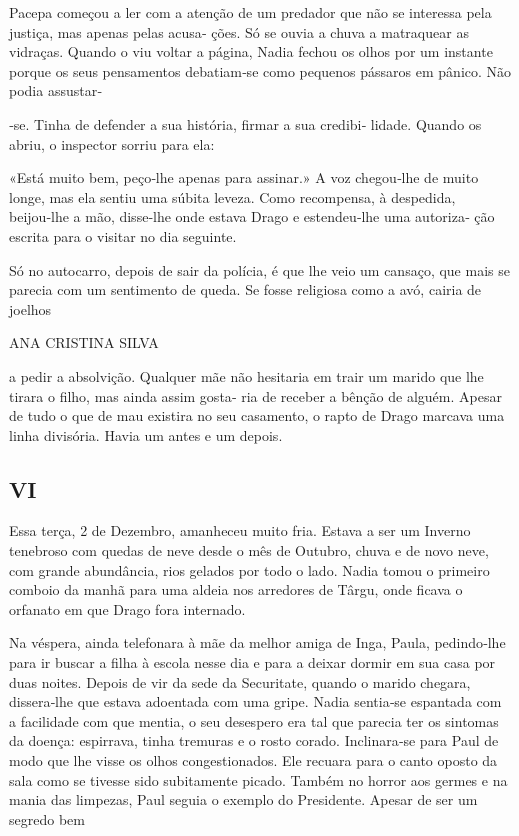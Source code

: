 Pacepa começou a ler com a atenção de um predador que não se interessa
pela justiça, mas apenas pelas acusa‑ ções. Só se ouvia a chuva a
matraquear as vidraças. Quando o viu voltar a página, Nadia fechou os
olhos por um instante porque os seus pensamentos debatiam‑se como
pequenos pássaros em pânico. Não podia assustar‑

‑se. Tinha de defender a sua história, firmar a sua credibi‑ lidade.
Quando os abriu, o inspector sorriu para ela:

«Está muito bem, peço‑lhe apenas para assinar.» A voz chegou‑lhe de
muito longe, mas ela sentiu uma súbita leveza. Como recompensa, à
despedida, beijou‑lhe a mão, disse‑lhe onde estava Drago e estendeu‑lhe
uma autoriza‑ ção escrita para o visitar no dia seguinte.

Só no autocarro, depois de sair da polícia, é que lhe veio um cansaço,
que mais se parecia com um sentimento de queda. Se fosse religiosa como
a avó, cairia de joelhos

ANA CRISTINA SILVA

a pedir a absolvição. Qualquer mãe não hesitaria em trair um marido que
lhe tirara o filho, mas ainda assim gosta‑ ria de receber a bênção de
alguém. Apesar de tudo o que de mau existira no seu casamento, o rapto
de Drago marcava uma linha divisória. Havia um antes e um depois.

\subsection{VI}

Essa terça, 2 de Dezembro, amanheceu muito fria. Estava a ser um Inverno
tenebroso com quedas de neve desde o mês de Outubro, chuva e de novo
neve, com grande abundância, rios gelados por todo o lado. Nadia tomou o
primeiro comboio da manhã para uma aldeia nos arredores de Târgu, onde
ficava o orfanato em que Drago fora internado.

Na véspera, ainda telefonara à mãe da melhor amiga de Inga, Paula,
pedindo‑lhe para ir buscar a filha à escola nesse dia e para a deixar
dormir em sua casa por duas noites. Depois de vir da sede da Securitate,
quando o marido chegara, dissera‑lhe que estava adoentada com uma gripe.
Nadia sentia‑se espantada com a facilidade com que mentia, o seu
desespero era tal que parecia ter os sintomas da doença: espirrava,
tinha tremuras e o rosto corado. Inclinara‑se para Paul de modo que lhe
visse os olhos congestionados. Ele recuara para o canto oposto da sala
como se tivesse sido subitamente picado. Também no horror aos germes e
na mania das limpezas, Paul seguia o exemplo do Presidente. Apesar de
ser um segredo bem

